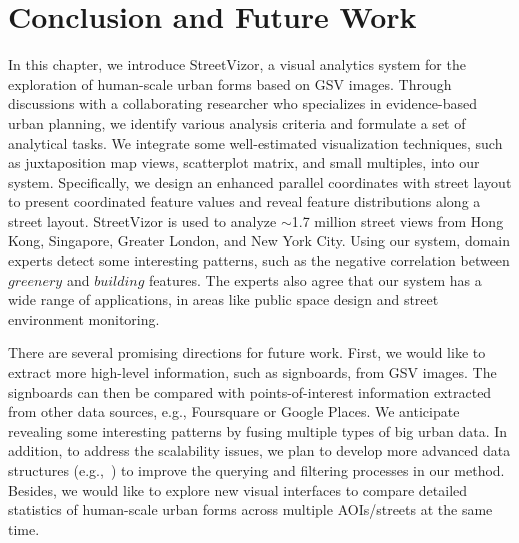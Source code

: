 \section{Conclusion and Future Work}

In this chapter, we introduce StreetVizor, a visual analytics system for the exploration of human-scale urban forms based on GSV images.
Through discussions with a collaborating researcher who specializes in evidence-based urban planning, we identify various analysis criteria and formulate a set of analytical tasks.
We integrate some well-estimated visualization techniques, such as juxtaposition map views, scatterplot matrix, and small multiples, into our system.
Specifically, we design an enhanced parallel coordinates with street layout to present coordinated feature values and reveal feature distributions along a street layout.
StreetVizor is used to analyze $\sim$1.7 million street views from Hong Kong, Singapore, Greater London, and New York City.
Using our system, domain experts detect some interesting patterns, such as the negative correlation between $greenery$ and $building$ features.
The experts also agree that our system has a wide range of applications, in areas like public space design and  street environment monitoring.

There are several promising directions for future work.
First, we would like to extract more high-level information, such as signboards, from GSV images.
The signboards can then be compared with points-of-interest information extracted from other data sources, e.g., Foursquare or Google Places.
We anticipate revealing some interesting patterns by fusing multiple types of big urban data.
In addition, to address the scalability issues, we plan to develop more advanced data structures (e.g.,~\cite{lins_2013_nanocubes, wang_2017_gaussian}) to improve the querying and filtering processes in our method.
Besides, we would like to explore new visual interfaces to compare detailed statistics of human-scale urban forms across multiple AOIs/streets at the same time.
